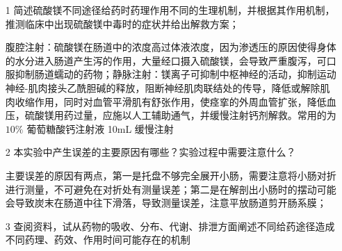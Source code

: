 \documentclass[UTF8]{ctexart}
\begin{document}
\begin{itemize}
    \item [1] 简述硫酸镁不同途径给药时药理作用不同的生理机制，并根据其作用机制，推测临床中出现硫酸镁中毒时的症状并给出解救方案；

        腹腔注射：硫酸镁在肠道中的浓度高过体液浓度，因为渗透压的原因使得身体的水分进入肠道产生泻的作用，大量经口摄入硫酸镁，会导致严重腹泻，可口服抑制肠道蠕动的药物；静脉注射：镁离子可抑制中枢神经的活动，抑制运动神经-肌肉接头乙酰胆碱的释放，阻断神经肌肉联结处的传导，降低或解除肌肉收缩作用，同时对血管平滑肌有舒张作用，使痉挛的外周血管扩张，降低血压，硫酸镁用药过量，应施以人工辅助通气，并缓慢注射钙剂解救。常用的为 $10\%$ 葡萄糖酸钙注射液 10mL 缓慢注射
    
    \item [2] 本实验中产生误差的主要原因有哪些？实验过程中需要注意什么？
     
        主要误差的原因有两点，第一是托盘不够完全展开小肠，需要注意将小肠对折进行测量，不可避免在对折处有测量误差；第二是在解剖出小肠时的摆动可能会导致炭末在肠道中往下滑落，导致测量误差，注意平放肠道剪开肠系膜；

    \item [3] 查阅资料，试从药物的吸收、分布、代谢、排泄方面阐述不同给药途径造成不同药理、药效、作用时间可能存在的机制
\end{itemize}
    
\end{document}
